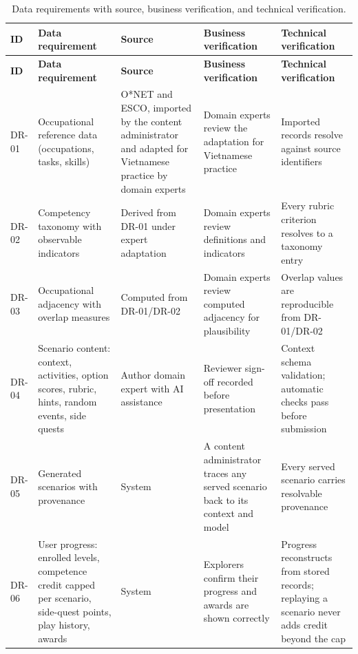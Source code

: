 {\small
\begin{longtable}{|>{\raggedright\arraybackslash}p{}|>{\raggedright\arraybackslash}p{}|>{\raggedright\arraybackslash}p{}|>{\raggedright\arraybackslash}p{}|>{\raggedright\arraybackslash}p{}|}
\caption{Data requirements with source, business verification, and technical verification.} \\
\hline
\textbf{ID} & \textbf{Data requirement} & \textbf{Source} & \textbf{Business verification} & \textbf{Technical verification} \\ \hline
\endfirsthead
\hline
\textbf{ID} & \textbf{Data requirement} & \textbf{Source} & \textbf{Business verification} & \textbf{Technical verification} \\ \hline
\endhead
DR-01 & Occupational reference data (occupations, tasks, skills) & O*NET and ESCO, imported by the content administrator and adapted for Vietnamese practice by domain experts & Domain experts review the adaptation for Vietnamese practice & Imported records resolve against source identifiers \\ \hline
DR-02 & Competency taxonomy with observable indicators & Derived from DR-01 under expert adaptation & Domain experts review definitions and indicators & Every rubric criterion resolves to a taxonomy entry \\ \hline
DR-03 & Occupational adjacency with overlap measures & Computed from DR-01/DR-02 & Domain experts review computed adjacency for plausibility & Overlap values are reproducible from DR-01/DR-02 \\ \hline
DR-04 & Scenario content: context, activities, option scores, rubric, hints, random events, side quests & Author domain expert with AI assistance & Reviewer sign-off recorded before presentation & Context schema validation; automatic checks pass before submission \\ \hline
DR-05 & Generated scenarios with provenance & System & A content administrator traces any served scenario back to its context and model & Every served scenario carries resolvable provenance \\ \hline
DR-06 & User progress: enrolled levels, competence credit capped per scenario, side-quest points, play history, awards & System & Explorers confirm their progress and awards are shown correctly & Progress reconstructs from stored records; replaying a scenario never adds credit beyond the cap \\ \hline

\end{longtable}}
